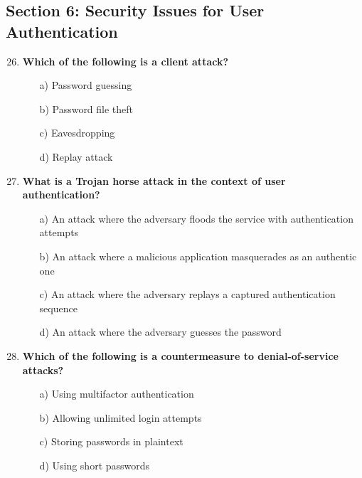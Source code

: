 \documentclass{article}
\begin{document}
\subsection*{Section 6: Security Issues for User Authentication}
\begin{enumerate}
    \setcounter{enumi}{25}
    \item \textbf{Which of the following is a client attack?}
    \begin{itemize}
        \item[a)] Password guessing  
        \item[b)] Password file theft  
        \item[c)] Eavesdropping  
        \item[d)] Replay attack  
    \end{itemize}

    \item \textbf{What is a Trojan horse attack in the context of user authentication?}
    \begin{itemize}
        \item[a)] An attack where the adversary floods the service with authentication attempts  
        \item[b)] An attack where a malicious application masquerades as an authentic one  
        \item[c)] An attack where the adversary replays a captured authentication sequence  
        \item[d)] An attack where the adversary guesses the password  
    \end{itemize}
\newpage
    \item \textbf{Which of the following is a countermeasure to denial-of-service attacks?}
    \begin{itemize}
        \item[a)] Using multifactor authentication  
        \item[b)] Allowing unlimited login attempts  
        \item[c)] Storing passwords in plaintext  
        \item[d)] Using short passwords  
    \end{itemize}
\end{enumerate}
\end{document}
